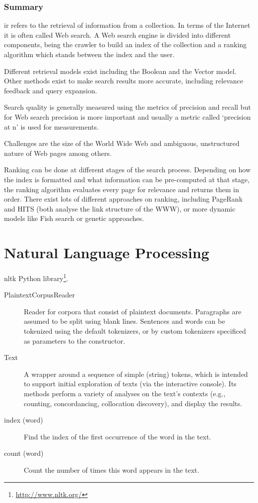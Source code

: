 \subsubsection*{Summary}

\ac{ir} refers to the retrieval of information from a collection. In terms of the Internet it is often called Web search. A Web search engine is divided into different components, being the crawler to build an index of the collection and a ranking algorithm which stands between the index and the user.

Different retrieval models exist including the Boolean and the Vector model. Other methods exist to make search results more accurate, including relevance feedback and query expansion.

Search quality is generally measured using the metrics of precision and recall but for Web search precision is more important and usually a metric called `precision at n' is used for measurements.

Challenges are the size of the World Wide Web and ambiguous, unstructured nature of Web pages among others.

Ranking can be done at different stages of the search process. Depending on how the index is formatted and what information can be pre-computed at that stage, the ranking algorithm evaluates every page for relevance and returns them in order. There exist lots of different approaches on ranking, including PageRank and HITS (both analyse the link structure of the WWW), or more dynamic models like Fish search or genetic approaches.


\section{Natural Language Processing}

\ac{nltk} Python library\footnote{\url{http://www.nltk.org/}}.

\begin{description}
  \item [PlaintextCorpusReader] Reader for corpora that consist of plaintext documents. Paragraphs are assumed to be split using blank lines. Sentences and words can be tokenized using the default tokenizers, or by custom tokenizers specificed as parameters to the constructor.
  \item [Text] A wrapper around a sequence of simple (string) tokens, which is intended to support initial exploration of texts (via the interactive console). Its methods perform a variety of analyses on the text’s contexts (e.g., counting, concordancing, collocation discovery), and display the results.
  \item [index (word)] Find the index of the first occurrence of the word in the text.
  \item [count (word)] Count the number of times this word appears in the text.
\end{description}


